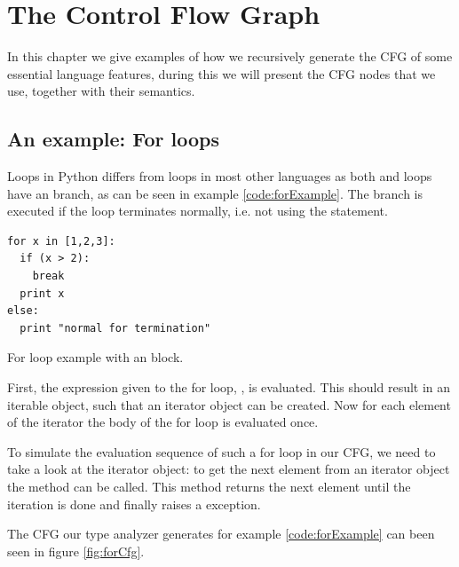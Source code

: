 \chapter{The Control Flow Graph}
\label{chap:CFGConstruction}
In this chapter we give examples of how we recursively generate the CFG of some essential language features, during this we will present the CFG nodes that we use, together with their semantics.



\section{An example: For loops}
\label{sec:CFGConstructionLoops}
Loops in Python differs from loops in most other languages as both  and  loops have an  branch, as can be seen in example \ref{code:forExample}. The  branch is executed if the loop terminates normally, i.e. not using the  statement.

\begin{listing}[H]
  \begin{verbatim}
for x in [1,2,3]:
  if (x > 2):
    break
  print x
else:
  print "normal for termination"
  \end{verbatim}
  \caption{For loop example with an  block.}\label{code:forExample}
\end{listing}

First, the expression given to the for loop, \inlinecode{[1,2,3]}, is evaluated. This should result in an iterable object, such that an iterator object can be created. Now for each element of the iterator the body of the for loop is evaluated once.

To simulate the evaluation sequence of such a for loop in our CFG, we need to take a look at the iterator object: 
to get the next element from an iterator object the  method can be called. This method returns the next element until the iteration is done and finally raises a  exception.

The CFG our type analyzer generates for example \ref{code:forExample} can been seen in figure \ref{fig:forCfg}.


